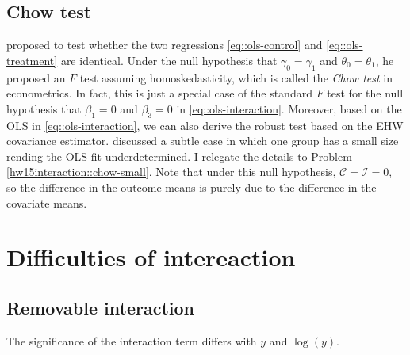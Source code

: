 \subsection{Chow test}


\citet{chow1960tests} proposed to test whether the two regressions \eqref{eq::ols-control} and \eqref{eq::ols-treatment} are identical. Under the null hypothesis that $\gamma_0 = \gamma_1$ and $\theta_0 = \theta_1$, he proposed an $F$ test assuming homoskedasticity, which is called the {\it Chow test} in econometrics. In fact, this is just a special case of the standard $F$ test for the null hypothesis that $\beta_1=0$ and $\beta_3 = 0$ in \eqref{eq::ols-interaction}. Moreover, based on the OLS in \eqref{eq::ols-interaction}, we can also derive the robust test based on the EHW covariance estimator. \citet{chow1960tests} discussed a subtle case in which one group has a small size rending the OLS fit underdetermined. I relegate the details to Problem \ref{hw15interaction::chow-small}. Note that under this null hypothesis, $\mathcal C = \mathcal I  = 0,$ so the difference in the outcome means is purely due to the difference in the covariate means. 







 



 
 





\section{Difficulties of intereaction}



\subsection{Removable interaction}


The significance of the interaction term differs with $y$ and $\log(y)$. 


